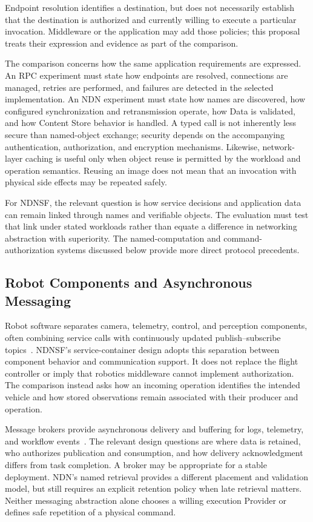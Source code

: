 Endpoint resolution identifies a destination, but does not necessarily establish that the destination is authorized and currently willing to execute a particular invocation. Middleware or the application may add those policies; this proposal treats their expression and evidence as part of the comparison.

The comparison concerns how the same application requirements are expressed. An RPC experiment must state how endpoints are resolved, connections are managed, retries are performed, and failures are detected in the selected implementation. An NDN experiment must state how names are discovered, how configured synchronization and retransmission operate, how Data is validated, and how Content Store behavior is handled. A typed call is not inherently less secure than named-object exchange; security depends on the accompanying authentication, authorization, and encryption mechanisms. Likewise, network-layer caching is useful only when object reuse is permitted by the workload and operation semantics. Reusing an image does not mean that an invocation with physical side effects may be repeated safely.

For NDNSF, the relevant question is how service decisions and application data can remain linked through names and verifiable objects. The evaluation must test that link under stated workloads rather than equate a difference in networking abstraction with superiority. The named-computation and command-authorization systems discussed below provide more direct protocol precedents.

\subsection{Robot Components and Asynchronous Messaging}
Robot software separates camera, telemetry, control, and perception components, often combining service calls with continuously updated publish--subscribe topics~\cite{ros,ros2}. NDNSF's service-container design adopts this separation between component behavior and communication support. It does not replace the flight controller or imply that robotics middleware cannot implement authorization. The comparison instead asks how an incoming operation identifies the intended vehicle and how stored observations remain associated with their producer and operation.

Message brokers provide asynchronous delivery and buffering for logs, telemetry, and workflow events~\cite{messagequeue}. The relevant design questions are where data is retained, who authorizes publication and consumption, and how delivery acknowledgment differs from task completion. A broker may be appropriate for a stable deployment. NDN's named retrieval provides a different placement and validation model, but still requires an explicit retention policy when late retrieval matters. Neither messaging abstraction alone chooses a willing execution Provider or defines safe repetition of a physical command.

